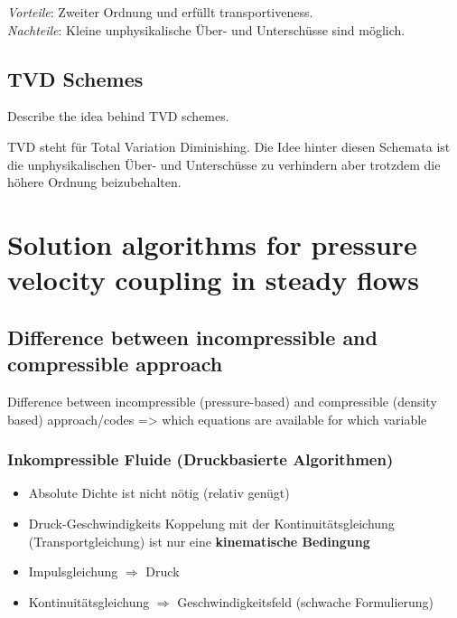 \documentclass[a4paper]{scrartcl}
\begin{document}
\textit{Vorteile}: Zweiter Ordnung und erfüllt transportiveness. \\
\textit{Nachteile}: Kleine unphysikalische Über- und Unterschüsse sind möglich.

\subsection{TVD Schemes} Describe the idea behind TVD schemes.

TVD steht für Total Variation Diminishing. Die Idee hinter diesen Schemata ist
die unphysikalischen Über- und Unterschüsse zu verhindern aber trotzdem die
höhere Ordnung beizubehalten.




\section{Solution algorithms for pressure velocity coupling in steady flows}
\subsection{Difference between incompressible and compressible approach}
Difference between incompressible (pressure-based) and compressible (density
based) approach/codes => which equations are available for which variable\\

\subsubsection{Inkompressible Fluide (Druckbasierte Algorithmen)}

\begin{itemize}
  \item Absolute Dichte ist nicht nötig (relativ genügt)
  \item Druck-Geschwindigkeits Koppelung mit der Kontinuitätsgleichung
  (Transportgleichung) ist nur eine \textbf{kinematische Bedingung}
  \item Impulsgleichung $\Rightarrow$ Druck
  \item Kontinuitätsgleichung $\Rightarrow$ Geschwindigkeitsfeld (schwache
  Formulierung)
\end{itemize}
\end{document}
